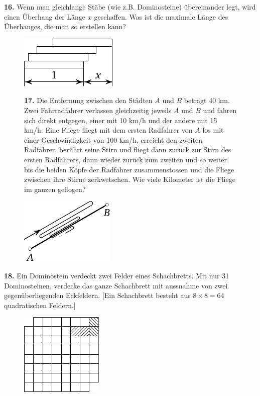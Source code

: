 \documentclass[12pt]{article} %
\begin{document}
{\bf 16.} Wenn man gleichlange Stäbe (wie z.B. Dominosteine) übereinander legt, wird einen Überhang der Länge $x$ geschaffen. Was ist die maximale Länge des Überhanges, die man so erstellen kann? 
\begin{figure}[h!]
\centering
\footnotesize
\includegraphics[scale=1]{taskbook-97}
\end{figure}
\begin{figure}[h]
\begin{minipage}[c][][c]{0.7 \textwidth}
{\bf 17.} Die Entfernung zwischen den Städten $A$ und $B$ beträgt 40 km. Zwei Fahrradfahrer verlassen gleichzeitig jeweils $A$ und $B$ und fahren sich direkt entgegen, einer mit 10 km/h und der andere mit 15 km/h. Eine Fliege fliegt mit dem ersten Radfahrer von $A$ los mit einer Geschwindigkeit von 100 km/h, erreicht den zweiten Radfahrer, berührt seine Stirn und fliegt dann zurück zur Stirn des ersten Radfahrers, dann wieder zurück zum zweiten und so weiter bis die beiden Köpfe der Radfahrer zusammenstossen und die Fliege zwischen ihre Stirne zerkwetschen. 
Wie viele Kilometer ist die Fliege im ganzen geflogen? 
\end{minipage}
\hfill
\begin{minipage}[c]{0.2 \textwidth}
\includegraphics[scale=1]{taskbook-1}
\end{minipage}
\end{figure}

\medskip\noindent
{\bf 18.} Ein Dominostein verdeckt zwei Felder eines Schachbretts. Mit nur 31 Dominosteinen, verdecke das ganze Schachbrett mit aussnahme von zwei gegenüberliegenden Eckfeldern. [Ein Schachbrett besteht aus $8 \times 8 = 64$ quadratischen Feldern.]
\begin{figure}[h]
\centering
\footnotesize
\includegraphics[scale=1]{taskbook-2}
\end{figure}
\end{document}
